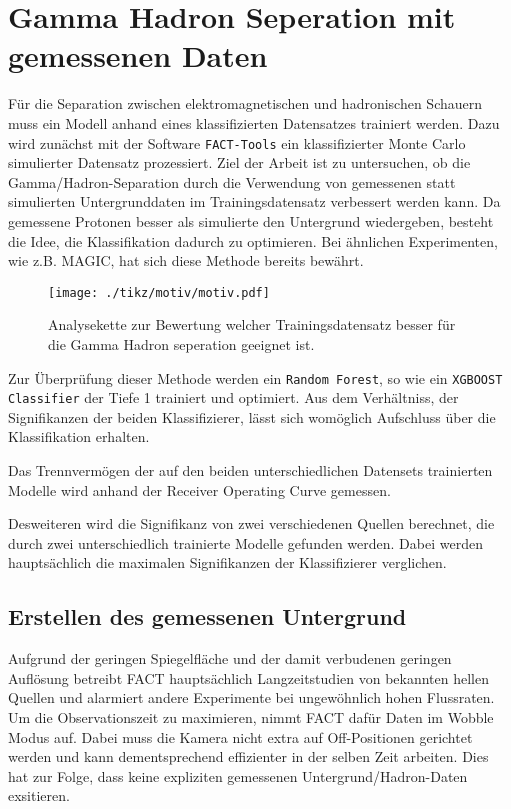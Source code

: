 \chapter{Gamma Hadron Seperation mit gemessenen Daten}
Für die Separation zwischen elektromagnetischen und hadronischen Schauern muss ein Modell anhand eines klassifizierten Datensatzes trainiert werden.
Dazu wird zunächst mit der Software \texttt{FACT-Tools} ein klassifizierter Monte Carlo simulierter Datensatz prozessiert.
Ziel der Arbeit ist zu untersuchen, ob die Gamma/Hadron-Separation durch die Verwendung von gemessenen statt simulierten Untergrunddaten im Trainingsdatensatz verbessert werden kann.
Da gemessene Protonen besser als simulierte den Untergrund wiedergeben, besteht die Idee, die Klassifikation dadurch zu optimieren.
Bei ähnlichen Experimenten, wie z.B. MAGIC, hat sich diese Methode bereits bewährt. 
\begin{figure}[H]
  \centering
  \texttt{[image: ./tikz/motiv/motiv.pdf]}
  \caption{Analysekette zur Bewertung welcher Trainingsdatensatz besser für die Gamma Hadron seperation geeignet ist.}
\end{figure}
Zur Überprüfung dieser Methode werden ein \texttt{Random Forest}, so wie ein \texttt{XGBOOST Classifier} der Tiefe 1 trainiert und optimiert.
Aus dem Verhältniss, der Signifikanzen der beiden Klassifizierer, lässt sich womöglich Aufschluss über die Klassifikation erhalten.

Das Trennvermögen der auf den beiden unterschiedlichen Datensets trainierten Modelle wird anhand der Receiver Operating Curve gemessen.

Desweiteren wird die Signifikanz von zwei verschiedenen Quellen berechnet, die durch zwei unterschiedlich trainierte Modelle gefunden werden. 
Dabei werden hauptsächlich die maximalen Signifikanzen der Klassifizierer verglichen.
\section{Erstellen des gemessenen Untergrund}
\label{sec:makeUnter}
Aufgrund der geringen Spiegelfläche und der damit verbudenen geringen Auflösung betreibt FACT hauptsächlich Langzeitstudien von bekannten hellen Quellen und alarmiert andere Experimente bei ungewöhnlich hohen Flussraten.
Um die Observationszeit zu maximieren, nimmt FACT dafür Daten im Wobble Modus auf. 
Dabei muss die Kamera nicht extra auf Off-Positionen gerichtet werden und kann dementsprechend effizienter in der selben Zeit arbeiten. 
Dies hat zur Folge, dass keine expliziten gemessenen Untergrund/Hadron-Daten exsitieren. 

